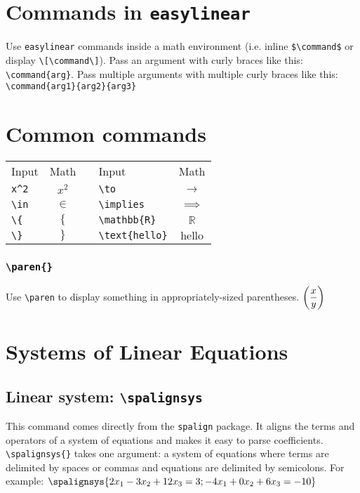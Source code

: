 \documentclass{article}
\begin{document}
\section{Commands in \texttt{easylinear}}
Use \texttt{easylinear} commands inside a math environment (i.e. inline \verb=$\command$= or display \verb=\[\command\]=). Pass an argument with curly braces like this: \verb=\command{arg}=. Pass multiple arguments with multiple curly braces like this: \verb=\command{arg1}{arg2}{arg3}=

\section{Common commands}
\begin{tabular}{lcclc}
Input &  Math & \qquad \qquad & Input & Math\\
\verb|x^2| & $x^2$ & \qquad \qquad & \verb|\to| & $\to$ \\
\verb|\in| & $\in$ & \qquad \qquad & \verb|\implies| & $\implies$ \\
\verb|\{| & $\{$ & \qquad \qquad & \verb|\mathbb{R}| & $\mathbb{R}$ \\
\verb|\}| & $\}$ & \qquad \qquad & \verb|\text{hello}| & $\text{hello}$ \\
\end{tabular}
\subsubsection{\texttt{\textbackslash paren\{\}}}
Use \verb=\paren= to display something in appropriately-sized parentheses.
\LTXexample[style=A]
$\left(\dfrac{x}{y}\right)$
\endLTXexample

\pagebreak
\section{Systems of Linear Equations}
\subsection{Linear system: \texttt{\textbackslash spalignsys}}
This command comes directly from the \texttt{spalign} package. It aligns the terms and operators of a system of equations and makes it easy to parse coefficients. \verb=\spalignsys{}= takes one argument: a system of equations where terms are delimited by spaces or commas and equations are delimited by semicolons. For example:
\LTXexample[style=A]
$\spalignsys{2x_1 - 3x_2 + 12x_3 = 3; -4x_1 + 0x_2 + 6x_3 = -10}$
\endLTXexample
\end{document}
